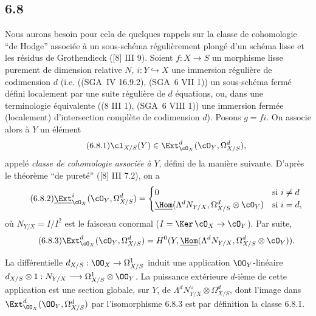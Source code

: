 \subsection*{6.8}
Nous aurons besoin pour cela de quelques rappels sur la classe de cohomologie ``de Hodge'' associée à un sous-schéma régulièrement plongé d'un schéma lisse et les résidus de Grothendieck ([8] III 9). Soient $f:X\to S$ un morphisme lisse purement de dimension relative $N$, $i:Y\hookrightarrow X$ une immersion régulière de codimension $d$ (i.e. ((SGA~IV 16.9.2), (SGA~6 VII 1)) un sous-schéma fermé défini localement par une suite régulière de $d$ équations, ou, dans une terminologie équivalente ((8 III 1), (SGA~6 VIII 1)) une immersion fermée (localement) d'intersection complète de codimension $d$). Posons $g=fi$. On associe alors à $Y$ un élément
\begin{equation}
\tag{6.8.1}
\cl_{X/S}(Y)\in\Ext^d_{\cO_X}(\cO_Y,\Omega^d_{X/S}),
\end{equation}
appelé \emph{classe de cohomologie associée à} $Y$, défini de la manière suivante. D'après le théorème ``de pureté'' ([8] III 7.2), on a
\begin{equation}
\tag{6.8.2}
\underline{\Ext}^i_{\cO_X}(\cO_Y,\Omega^d_{X/S})=
\begin{cases}
0& \text{si } i\ne d\\
\underline{\Hom}(\Lambda^d N_{Y/X},\Omega^d_{X/S}\otimes\cO_Y)& \text{si } i=d,
\end{cases}
\end{equation}
où $N_{Y/X}=I/I^2$ est le faisceau conormal ($I=\Ker\,\cO_X\to\cO_Y$). Par suite,
\begin{equation}
\tag{6.8.3}
\Ext^d_{\cO_X}(\cO_Y,\Omega^d_{X/S})=H^0(Y,\underline{\Hom}(\Lambda^dN_{Y/X},\Omega^d_{X/S}\otimes\cO_Y)).
\end{equation}

La différentielle $d_{X/S}:\OO_X\to\Omega^1_{X/S}$ induit une application $\OO_Y$-linéaire $d_{X/S}\otimes 1:N_{Y/X}\longrightarrow \Omega^1_{X/S}\otimes\OO_Y$. La puissance extérieure $d$-ième de cette application est une section globale, sur $Y$, de $\Lambda^d N_{Y/X}^{\vee}\otimes\Omega^d_{X/S}$, dont l'image dans $\Ext^d_{\OO_X}(\OO_Y,\Omega^d_{X/S})$ par l'isomorphisme 6.8.3 est par définition la classe 6.8.1.


